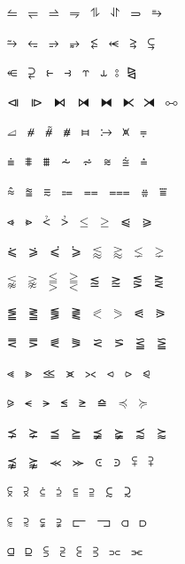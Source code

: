 \documentclass{article}
\begin{document}
$\leftharpoonupdash$ $\dashleftharpoondown$ $\rightharpoonupdash$ $\dashrightharpoondown$ $\updownharpoonsleftright$ $\downupharpoonsleftright$ $\rightimply$ $\equalrightarrow$ \par
$\similarrightarrow$ $\leftarrowsimilar$ $\rightarrowsimilar$ $\rightarrowapprox$ $\ltlarr$ $\leftarrowless$ $\gtrarr$ $\subrarr$ \par
$\leftarrowsubset$ $\suplarr$ $\leftfishtail$ $\rightfishtail$ $\upfishtail$ $\downfishtail$ $\typecolon$ $\rtriltri$ \par
$\ltrivb$ $\vbrtri$ $\lfbowtie$ $\rfbowtie$ $\fbowtie$ $\lftimes$ $\rftimes$ $\dualmap$ \par
$\lrtriangleeq$ $\eparsl$ $\smeparsl$ $\eqvparsl$ $\gleichstark$ $\ruledelayed$ $\veeonwedge$ $\eqdot$ \par
$\dotequiv$ $\equivVert$ $\equivVvert$ $\dotsim$ $\simrdots$ $\simminussim$ $\congdot$ $\asteq$ \par
$\hatapprox$ $\approxeqq$ $\eqqsim$ $\Coloneq$ $\eqeq$ $\eqeqeq$ $\ddotseq$ $\equivDD$ \par
$\ltcir$ $\gtcir$ $\ltquest$ $\gtquest$ $\leqslant$ $\geqslant$ $\lesdot$ $\gesdot$ \par
$\lesdoto$ $\gesdoto$ $\lesdotor$ $\gesdotol$ $\lessapprox$ $\gtrapprox$ $\lneq$ $\gneq$ \par
$\lnapprox$ $\gnapprox$ $\lesseqqgtr$ $\gtreqqless$ $\lsime$ $\gsime$ $\lsimg$ $\gsiml$ \par
$\lgE$ $\glE$ $\lesges$ $\gesles$ $\eqslantless$ $\eqslantgtr$ $\elsdot$ $\egsdot$ \par
$\eqqless$ $\eqqgtr$ $\eqqslantless$ $\eqqslantgtr$ $\simless$ $\simgtr$ $\simlE$ $\simgE$ \par
$\Lt$ $\Gt$ $\partialmeetcontraction$ $\glj$ $\gla$ $\ltcc$ $\gtcc$ $\lescc$ \par
$\gescc$ $\smt$ $\lat$ $\smte$ $\late$ $\bumpeqq$ $\preceq$ $\succeq$ \par
$\precneq$ $\succneq$ $\preceqq$ $\succeqq$ $\precneqq$ $\succneqq$ $\precapprox$ $\succapprox$ \par
$\precnapprox$ $\succnapprox$ $\Prec$ $\Succ$ $\subsetdot$ $\supsetdot$ $\subsetplus$ $\supsetplus$ \par
$\submult$ $\supmult$ $\subedot$ $\supedot$ $\subseteqq$ $\supseteqq$ $\subsim$ $\supsim$ \par
$\subsetapprox$ $\supsetapprox$ $\subsetneqq$ $\supsetneqq$ $\lsqhook$ $\rsqhook$ $\csub$ $\csup$ \par
$\csube$ $\csupe$ $\subsup$ $\supsub$ $\subsub$ $\supsup$ $\suphsub$ $\supdsub$ \par
\end{document}
